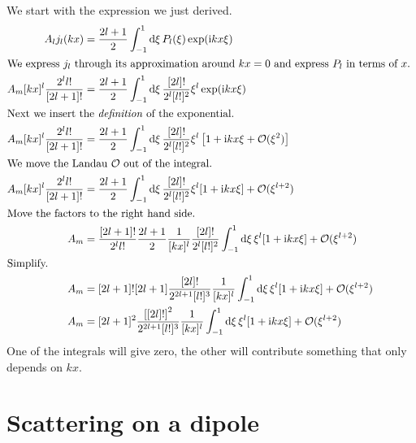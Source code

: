 \documentclass[11pt, english, fleqn, DIV=15, headinclude, BCOR=1.5cm]{scrartcl}
\begin{document}
We start with the expression we just derived.
\begin{align*}
    A_l j_l(kx)
    &= \frac{2l+1}{2} \int_{-1}^1 \dif \xi \, P_l(\xi) \exp(\iup k x \xi) \\
    \intertext{%
        We express $j_l$ through its approximation around $kx = 0$ and express
        $P_l$ in terms of $x$.
    }
    A_m [kx]^l \frac{2^l l!}{[2l+1]!}
    &= \frac{2l+1}{2} \int_{-1}^1 \dif \xi \, \frac{[2l]!}{2^l[l!]^2} \xi^l \exp(\iup k x \xi) \\
    \intertext{%
        Next we insert the \emph{definition} of the exponential.
    }
    A_m [kx]^l \frac{2^l l!}{[2l+1]!}
    &= \frac{2l+1}{2} \int_{-1}^1 \dif \xi \, \frac{[2l]!}{2^l[l!]^2} \xi^l
    \sbr{1 + \iup k x \xi + \mathcal O(\xi^2)} \\
    \intertext{%
        We move the Landau $\mathcal O$ out of the integral.
    }
    A_m [kx]^l \frac{2^l l!}{[2l+1]!}
    &= \frac{2l+1}{2} \int_{-1}^1 \dif \xi \, \frac{[2l]!}{2^l[l!]^2} \xi^l
    [1 + \iup k x \xi] + \mathcal O(\xi^{l+2}) \\
    \intertext{%
        Move the factors to the right hand side.
    }
    A_m &= \frac{[2l+1]!}{2^l l!} \frac{2l+1}{2} \frac{1}{[kx]^l}
    \frac{[2l]!}{2^l[l!]^2} \int_{-1}^1 \dif \xi \, \xi^l [1 + \iup k x \xi] +
    \mathcal O(\xi^{l+2}) \\
    \intertext{%
        Simplify.
    }
    A_m &= [2l+1]! [2l+1] \frac{[2l]!}{2^{2l+1} [l!]^3} \frac{1}{[kx]^l}
    \int_{-1}^1 \dif \xi \, \xi^l [1 + \iup k x \xi] + \mathcal O(\xi^{l+2}) \\
    A_m &= [2l+1]^2 \frac{\sbr{[2l]!}^2}{2^{2l+1} [l!]^3} \frac{1}{[kx]^l}
    \int_{-1}^1 \dif \xi \, \xi^l [1 + \iup k x \xi] + \mathcal O(\xi^{l+2})
\end{align*}
One of the integrals will give zero, the other will contribute something that
only depends on $kx$.

\section{Scattering on a dipole}
\end{document}
